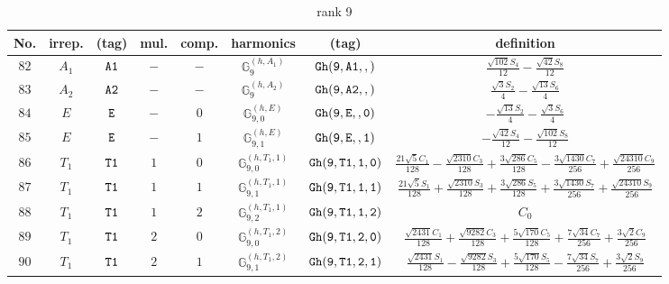 \documentclass[fleqn,8pt]{jsarticle}
\begin{document}
\begin{table}[ht!]
\begin{center}
\caption{rank 9}
\renewcommand{\arraystretch}{1.3}
\begin{tabular}{cccccccc} \hline \hline
No. & irrep. & (tag) & mul. & comp. & harmonics & (tag) & definition \\ \hline
$ 82 $ & $ A_{1} $ & $ {\tt A1} $ & $ - $ & $ - $ & $ \mathbb{G}_{9}^{(h,A_{1})} $ & $ {\tt Gh(9,A1,,)} $ & $ \frac{\sqrt{102} S_{4}}{12} - \frac{\sqrt{42} S_{8}}{12} $ \\
$ 83 $ & $ A_{2} $ & $ {\tt A2} $ & $ - $ & $ - $ & $ \mathbb{G}_{9}^{(h,A_{2})} $ & $ {\tt Gh(9,A2,,)} $ & $ \frac{\sqrt{3} S_{2}}{4} - \frac{\sqrt{13} S_{6}}{4} $ \\
$ 84 $ & $ E $ & $ {\tt E} $ & $ - $ & $ 0 $ & $ \mathbb{G}_{9,0}^{(h,E)} $ & $ {\tt Gh(9,E,,0)} $ & $ - \frac{\sqrt{13} S_{2}}{4} - \frac{\sqrt{3} S_{6}}{4} $ \\
$ 85 $ & $ E $ & $ {\tt E} $ & $ - $ & $ 1 $ & $ \mathbb{G}_{9,1}^{(h,E)} $ & $ {\tt Gh(9,E,,1)} $ & $ - \frac{\sqrt{42} S_{4}}{12} - \frac{\sqrt{102} S_{8}}{12} $ \\
$ 86 $ & $ T_{1} $ & $ {\tt T1} $ & $ 1 $ & $ 0 $ & $ \mathbb{G}_{9,0}^{(h,T_{1},1)} $ & $ {\tt Gh(9,T1,1,0)} $ & $ \frac{21 \sqrt{5} C_{1}}{128} - \frac{\sqrt{2310} C_{3}}{128} + \frac{3 \sqrt{286} C_{5}}{128} - \frac{3 \sqrt{1430} C_{7}}{256} + \frac{\sqrt{24310} C_{9}}{256} $ \\
$ 87 $ & $ T_{1} $ & $ {\tt T1} $ & $ 1 $ & $ 1 $ & $ \mathbb{G}_{9,1}^{(h,T_{1},1)} $ & $ {\tt Gh(9,T1,1,1)} $ & $ \frac{21 \sqrt{5} S_{1}}{128} + \frac{\sqrt{2310} S_{3}}{128} + \frac{3 \sqrt{286} S_{5}}{128} + \frac{3 \sqrt{1430} S_{7}}{256} + \frac{\sqrt{24310} S_{9}}{256} $ \\
$ 88 $ & $ T_{1} $ & $ {\tt T1} $ & $ 1 $ & $ 2 $ & $ \mathbb{G}_{9,2}^{(h,T_{1},1)} $ & $ {\tt Gh(9,T1,1,2)} $ & $ C_{0} $ \\
$ 89 $ & $ T_{1} $ & $ {\tt T1} $ & $ 2 $ & $ 0 $ & $ \mathbb{G}_{9,0}^{(h,T_{1},2)} $ & $ {\tt Gh(9,T1,2,0)} $ & $ \frac{\sqrt{2431} C_{1}}{128} + \frac{\sqrt{9282} C_{3}}{128} + \frac{5 \sqrt{170} C_{5}}{128} + \frac{7 \sqrt{34} C_{7}}{256} + \frac{3 \sqrt{2} C_{9}}{256} $ \\
$ 90 $ & $ T_{1} $ & $ {\tt T1} $ & $ 2 $ & $ 1 $ & $ \mathbb{G}_{9,1}^{(h,T_{1},2)} $ & $ {\tt Gh(9,T1,2,1)} $ & $ \frac{\sqrt{2431} S_{1}}{128} - \frac{\sqrt{9282} S_{3}}{128} + \frac{5 \sqrt{170} S_{5}}{128} - \frac{7 \sqrt{34} S_{7}}{256} + \frac{3 \sqrt{2} S_{9}}{256} $ \\

\end{tabular}
\end{center}
\end{table}
\end{document}
